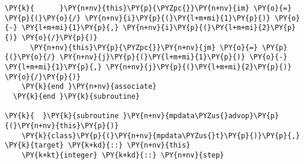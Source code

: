 \begin{Verbatim}[commandchars=\\\{\}]
\PY{k}{      }\PY{n+nv}{this}\PY{p}{\PYZpc{}}\PY{n+nv}{im} \PY{o}{=} \PY{p}{(}\PY{o}{/} \PY{n+nv}{i}\PY{p}{(}\PY{l+m+mi}{1}\PY{p}{)} \PY{o}{-} \PY{l+m+mi}{1}\PY{p}{,} \PY{n+nv}{i}\PY{p}{(}\PY{l+m+mi}{2}\PY{p}{)} \PY{o}{/}\PY{p}{)}
      \PY{n+nv}{this}\PY{p}{\PYZpc{}}\PY{n+nv}{jm} \PY{o}{=} \PY{p}{(}\PY{o}{/} \PY{n+nv}{j}\PY{p}{(}\PY{l+m+mi}{1}\PY{p}{)} \PY{o}{-} \PY{l+m+mi}{1}\PY{p}{,} \PY{n+nv}{j}\PY{p}{(}\PY{l+m+mi}{2}\PY{p}{)} \PY{o}{/}\PY{p}{)}
    \PY{k}{end }\PY{n+nv}{associate}
  \PY{k}{end }\PY{k}{subroutine}

\PY{k}{  }\PY{k}{subroutine }\PY{n+nv}{mpdata\PYZus{}advop}\PY{p}{(}\PY{n+nv}{this}\PY{p}{)}
    \PY{k}{class}\PY{p}{(}\PY{n+nv}{mpdata\PYZus{}t}\PY{p}{)}\PY{p}{,} \PY{k}{target} \PY{k+kd}{::} \PY{n+nv}{this}
    \PY{k+kt}{integer} \PY{k+kd}{::} \PY{n+nv}{step}


\end{Verbatim}
